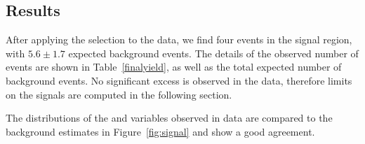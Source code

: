 

\subsection{Results}\label{sect:results}
After applying the selection to the data, we find four events in the signal region, with $5.6\pm1.7$ expected background events. 
The details of the observed number of events are shown in Table~\ref{finalyield}, as well as the total expected number of background events. 
No significant excess is observed in the data, therefore limits on the signals are computed in the following section.

The distributions of the \met{} and \HT{} variables observed in data are compared to the background estimates in Figure~\ref{fig:signal} and show a good agreement.

